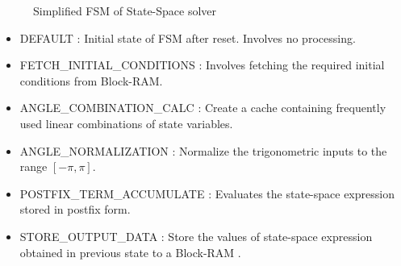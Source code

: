\begin{figure}[H]
\centering
{}\caption{Simplified FSM of State-Space solver}\label{fig:fsm_state_space}
\end{figure}


\begin{itemize}
\item DEFAULT : Initial state of FSM after reset. Involves no processing.
\item FETCH\_INITIAL\_CONDITIONS : Involves fetching the required initial conditions from Block-RAM.
\item ANGLE\_COMBINATION\_CALC : Create a cache containing frequently used linear combinations of state variables.
\item ANGLE\_NORMALIZATION : Normalize the trigonometric inputs to the range $[-\pi, \pi]$.
\item POSTFIX\_TERM\_ACCUMULATE : Evaluates the state-space expression stored in postfix form.
\item STORE\_OUTPUT\_DATA : Store the values of state-space expression obtained in previous state to a Block-RAM .
\end{itemize}

